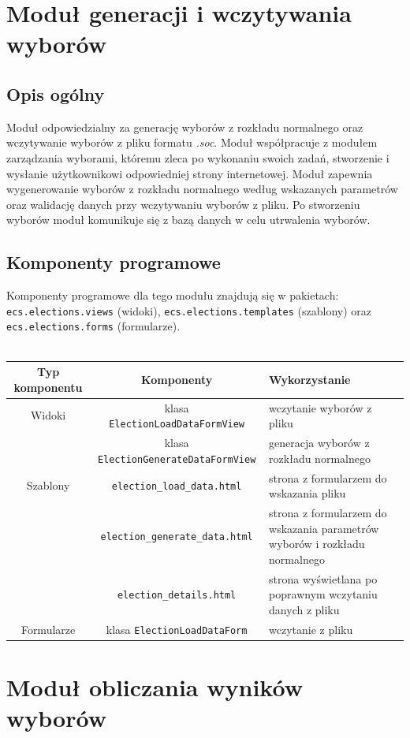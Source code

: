 \documentclass[pdflatex,11pt]{../aghdoc_version2}
\newcommand{\code}[1]{\texttt{#1}}
\begin{document}
\section{Moduł generacji i wczytywania wyborów}
\subsection{Opis ogólny}
Moduł odpowiedzialny za generację wyborów z rozkładu normalnego oraz wczytywanie
wyborów z pliku formatu \textit{.soc}. Moduł współpracuje z modułem zarządzania wyborami,
któremu zleca po wykonaniu swoich zadań, stworzenie i wysłanie użytkownikowi
odpowiedniej strony internetowej. Moduł zapewnia wygenerowanie wyborów z rozkładu normalnego według wskazanych parametrów oraz walidację danych przy wczytywaniu
wyborów z pliku. Po stworzeniu wyborów moduł komunikuje się z bazą danych w celu
utrwalenia wyborów.

\subsection{Komponenty programowe}
Komponenty programowe dla tego modułu znajdują się w pakietach:  \code{ecs.elections.views} (widoki), \code{ecs.elections.templates} (szablony) oraz \code{ecs.elections.forms} (formularze).\\ \\
\begin{tabular}{|c|c|p{5cm}|}
\hline
\textbf{Typ komponentu} & \textbf{Komponenty} & \textbf{Wykorzystanie} \\
\hline
Widoki & klasa \code{ElectionLoadDataFormView} & wczytanie wyborów z pliku \\
\cline{2-3}
 & klasa
\code{ElectionGenerateDataFormView} & generacja wyborów z rozkładu
normalnego \\
\hline
Szablony & \code{election\_load\_data.html} & strona z formularzem do
wskazania pliku \\
\cline{2-3}
 & \code{election\_generate\_data.html} & strona z formularzem do
wskazania parametrów wyborów i
rozkładu normalnego \\
\cline{2-3}
 & \code{election\_details.html} & strona wyświetlana po
poprawnym wczytaniu danych z
pliku \\
\hline
Formularze & klasa \code{ElectionLoadDataForm} & wczytanie z pliku \\
\hline
\end{tabular}

\section{Moduł obliczania wyników wyborów}
\end{document}
